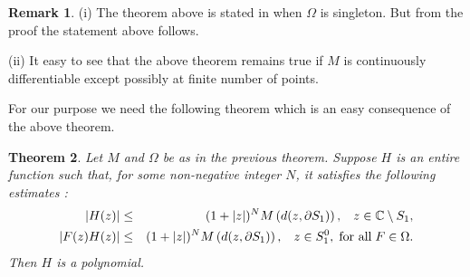 \documentclass[11pt,reqno]{amsart}
\newtheorem{theorem}{Theorem}[section]
\theoremstyle{definition}
\theoremstyle{definition}
\newtheorem{remark}[theorem]{Remark}
\numberwithin{equation}{section}
\begin{document}
\begin{remark}
(i) The  theorem above is stated in  \cite[Theorem 6.8]{Dah} when $\Omega$ is singleton. But from the proof the statement above  follows. 

(ii) It easy to see that the above theorem remains true if $M$ is continuously differentiable except possibly at finite number of points. 
\end{remark}
For our purpose we need the following theorem which is an easy consequence of the above theorem. 
\begin{theorem}\label{loglog theorem}
Let $M$ and $\Omega$ be as in the previous theorem. Suppose $H$ is an entire function such that, for some non-negative integer $N$, it satisfies the following estimates :
\begin{eqnarray*}
|H(z)|&\leq &(1+|z|)^NM\left(d(z,\partial S_1)\right),
\hspace{3mm}z\in\mathbb{C}\setminus S_1,\\
|F(z)H(z)|&\leq & (1+|z|)^NM\left(d(z,\partial S_1)\right),
\hspace{3mm}z\in S_1^0,
\hspace{1mm}\textup{for all}\hspace{1mm}F\in \Omega.
\end{eqnarray*}
Then $H$ is a polynomial. 
\end{theorem}
\end{document}
